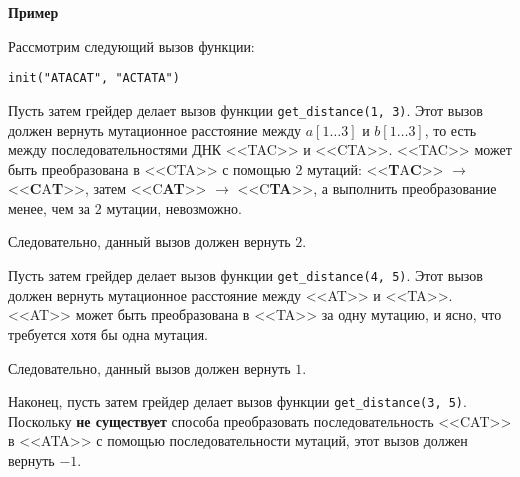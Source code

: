 \textbf{Пример}

Рассмотрим следующий вызов функции:

\texttt{init("ATACAT", "ACTATA")}

Пусть затем грейдер делает вызов функции \texttt{get\_distance(1, 3)}.
Этот вызов должен вернуть мутационное расстояние между $a[1\ldots 3]$ и $b[1\ldots 3]$, то есть между последовательностями ДНК <<TAC>> и <<CTA>>.
<<TAC>> может быть преобразована в <<CTA>> с помощью $2$ мутаций: <<\textbf{T}A\textbf{C}>> $\rightarrow$ <<\textbf{C}A\textbf{T}>>, затем <<C\textbf{AT}>> $\rightarrow$ <<C\textbf{TA}>>, а выполнить преобразование менее, чем за $2$ мутации, невозможно.

Следовательно, данный вызов должен вернуть $2$.

Пусть затем грейдер делает вызов функции \texttt{get\_distance(4, 5)}.
Этот вызов должен вернуть мутационное расстояние между <<AT>> и <<TA>>.
<<AT>> может быть преобразована в <<TA>> за одну мутацию, и ясно, что требуется хотя бы одна мутация.

Следовательно, данный вызов должен вернуть $1$.

Наконец, пусть затем грейдер делает вызов функции \texttt{get\_distance(3, 5)}.
Поскольку \textbf{не существует} способа преобразовать последовательность <<CAT>> в <<ATA>> с помощью последовательности мутаций, этот вызов должен вернуть $-1$.

